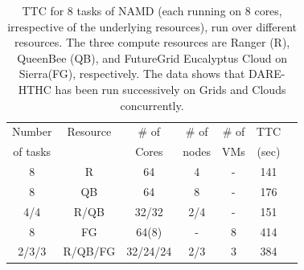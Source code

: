 \documentclass{sig-alternate}
\begin{document}
 \begin{table}
\small
 \begin{tabular}{|c|c|c|c|c|c|c|} 
 \hline 
 Number           & Resource    & \# of &  \# of     &     \# of     &	TTC  \\
of tasks                &     &  Cores    &nodes&   VMs  & (sec) \\  
\hline
8& R&	64	&4 & - &141\\
\hline                  
8& QB	&	64& 8 &	-&176 \\
\hline
4/4&R/QB	&	32/32 &2/4&-&151\\
\hline
8&FG	&	64(8) & - &8&414 \\
\hline
2/3/3&R/QB/FG	&32/24/24&2/3&	3 &384\\
\hline


\end{tabular}
\caption{TTC for 8 tasks of NAMD (each running on 8 cores,
  irrespective of the underlying resources), run over different resources. The three
  compute resources are Ranger (R), QueenBee (QB), 
  and  FutureGrid  Eucalyptus Cloud on Sierra(FG), respectively. The
  data shows that DARE-HTHC has been run successively on Grids and
  Clouds concurrently.}
 \label{table:HTHP-Distributed} 
\end{table}
\end{document}
